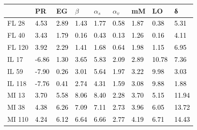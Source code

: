 \begin{tabular}{lllllllll}
\toprule
 & PR & EG & $β$ & $α_s$ & $α_v$ & mM & LO & δ \\
\midrule
FL 28 & \textcolor{black}{ 4.53 } & \textcolor{black}{ 2.89 } & \textcolor{black}{ 1.43 } & \textcolor{black}{ 1.77 } & \textcolor{black}{ 0.58 } & \textcolor{black}{ 1.87 } & \textcolor{black}{ 0.38 } & \textcolor{black}{ 5.31 } \\
FL 40 & \textcolor{black}{ 3.43 } & \textcolor{black}{ 1.79 } & \textcolor{black}{ 0.16 } & \textcolor{black}{ 0.43 } & \textcolor{black}{ 0.13 } & \textcolor{black}{ 1.26 } & \textcolor{black}{ 0.16 } & \textcolor{black}{ 4.11 } \\
FL 120 & \textcolor{black}{ 3.92 } & \textcolor{black}{ 2.29 } & \textcolor{black}{ 1.41 } & \textcolor{black}{ 1.68 } & \textcolor{black}{ 0.64 } & \textcolor{black}{ 1.98 } & \textcolor{black}{ 1.15 } & \textcolor{black}{ 6.95 } \\
IL 17 & \textcolor{black}{ -6.86 } & \textcolor{black}{ 1.30 } & \textcolor{black}{ 3.65 } & \textcolor{black}{ 5.83 } & \textcolor{black}{ 2.09 } & \textcolor{black}{ 2.89 } & \textcolor{black}{ 10.78 } & \textcolor{black}{ 7.36 } \\
IL 59 & \textcolor{black}{ -7.90 } & \textcolor{black}{ 0.26 } & \textcolor{black}{ 3.01 } & \textcolor{black}{ 5.64 } & \textcolor{black}{ 1.97 } & \textcolor{black}{ 3.22 } & \textcolor{black}{ 9.98 } & \textcolor{black}{ 3.03 } \\
IL 118 & \textcolor{black}{ -7.76 } & \textcolor{black}{ 0.41 } & \textcolor{black}{ 2.74 } & \textcolor{black}{ 4.31 } & \textcolor{black}{ 1.59 } & \textcolor{black}{ 3.08 } & \textcolor{black}{ 9.88 } & \textcolor{black}{ 1.88 } \\
MI 13 & \textcolor{black}{ 3.70 } & \textcolor{black}{ 5.58 } & \textcolor{black}{ 8.06 } & \textcolor{black}{ 8.40 } & \textcolor{black}{ 2.28 } & \textcolor{black}{ 3.70 } & \textcolor{black}{ 5.15 } & \textcolor{black}{ 11.94 } \\
MI 38 & \textcolor{black}{ 4.38 } & \textcolor{black}{ 6.26 } & \textcolor{black}{ 7.09 } & \textcolor{black}{ 7.11 } & \textcolor{black}{ 2.73 } & \textcolor{black}{ 3.96 } & \textcolor{black}{ 6.05 } & \textcolor{black}{ 13.72 } \\
MI 110 & \textcolor{black}{ 4.24 } & \textcolor{black}{ 6.12 } & \textcolor{black}{ 6.64 } & \textcolor{black}{ 6.66 } & \textcolor{black}{ 2.77 } & \textcolor{black}{ 4.19 } & \textcolor{black}{ 6.71 } & \textcolor{black}{ 14.43 } \\

\end{tabular}
